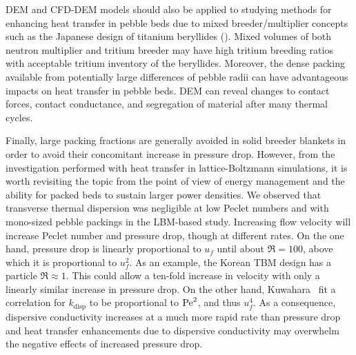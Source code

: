 DEM and CFD-DEM models should also be applied to studying methods for enhancing heat transfer in pebble beds due to mixed breeder/multiplier concepts such as the Japanese design of titanium beryllides (). Mixed volumes of both neutron multiplier and tritium breeder may have high tritium breeding ratios with acceptable tritium inventory of the beryllides. Moreover, the dense packing available from potentially large differences of pebble radii can have advantageous impacts on heat transfer in pebble beds. DEM can reveal changes to contact forces, contact conductance, and segregation of material after many thermal cycles. 

Finally, large packing fractions are generally avoided in solid breeder blankets in order to avoid their concomitant increase in pressure drop. However, from the investigation performed with heat transfer in lattice-Boltzmann simulations, it is worth revisiting the topic from the point of view of energy management and the ability for packed beds to sustain larger power densities. We observed that transverse thermal dispersion was negligible at low Peclet numbers and with mono-sized pebble packings in the LBM-based study. Increasing flow velocity will increase Peclet number and pressure drop, though at different rates. On the one hand, pressure drop is linearly proportional to $u_f$ until about $\Re = 100$, above which it is proportional to $u_f^2$. As an example, the Korean TBM design has a particle $\Re \approx 1$. This could allow a ten-fold increase in velocity with only a linearly similar increase in pressure drop. On the other hand, Kuwahara \etal~fit a correlation for $k_\text{disp}$ to be proportional to $\mathrm{Pe}^2$, and thus $u_f^4$. As a consequence, dispersive conductivity increases at a much more rapid rate than pressure drop and heat transfer enhancements due to dispersive conductivity may overwhelm the negative effects of increased pressure drop.

